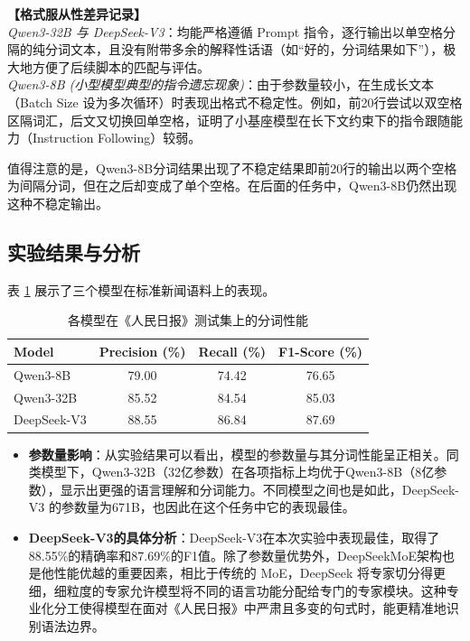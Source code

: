 \documentclass[11pt]{article}
\begin{document}
\begin{mdframed}[backgroundcolor=gray!10, roundcorner=5pt]
\textbf{【格式服从性差异记录】} \\
\textit{Qwen3-32B 与 DeepSeek-V3}：均能严格遵循 Prompt 指令，逐行输出以单空格分隔的纯分词文本，且没有附带多余的解释性话语（如“好的，分词结果如下”），极大地方便了后续脚本的匹配与评估。 \\
\textit{Qwen3-8B (小型模型典型的指令遗忘现象)}：由于参数量较小，在生成长文本（Batch Size 设为多次循环）时表现出格式不稳定性。例如，前20行尝试以双空格区隔词汇，后文又切换回单空格，证明了小基座模型在长下文约束下的指令跟随能力（Instruction Following）较弱。
\end{mdframed}
值得注意的是，Qwen3-8B分词结果出现了不稳定结果即前20行的输出以两个空格为间隔分词，但在之后却变成了单个空格。在后面的任务中，Qwen3-8B仍然出现这种不稳定输出。
\subsection{实验结果与分析}
表 \ref{tab:pku_result} 展示了三个模型在标准新闻语料上的表现。

\begin{table}[H]
    \centering
    \caption{各模型在《人民日报》测试集上的分词性能}
    \label{tab:pku_result}
    \begin{tabular}{l c c c}
        \toprule
        \textbf{Model} & \textbf{Precision (\%)} & \textbf{Recall (\%)} & \textbf{F1-Score (\%)} \\
        \midrule
        Qwen3-8B      & 79.00 & 74.42 & 76.65 \\
        Qwen3-32B     & 85.52& 84.54 & 85.03 \\
        DeepSeek-V3   & 88.55 & 86.84 & 87.69 \\
        \bottomrule
    \end{tabular}
\end{table}
\begin{itemize}
    \item \textbf{参数量影响}：从实验结果可以看出，模型的参数量与其分词性能呈正相关。同类模型下，Qwen3-32B（32亿参数）在各项指标上均优于Qwen3-8B（8亿参数），显示出更强的语言理解和分词能力。不同模型之间也是如此，DeepSeek-V3 的参数量为671B，也因此在这个任务中它的表现最佳。
    \item \textbf{DeepSeek-V3的具体分析}：DeepSeek-V3在本次实验中表现最佳，取得了88.55\%的精确率和87.69\%的F1值。除了参数量优势外，DeepSeekMoE架构也是他性能优越的重要因素，相比于传统的 MoE，DeepSeek 将专家切分得更细，细粒度的专家允许模型将不同的语言功能分配给专门的专家模块。这种专业化分工使得模型在面对《人民日报》中严肃且多变的句式时，能更精准地识别语法边界。
\end{itemize}
\end{document}

